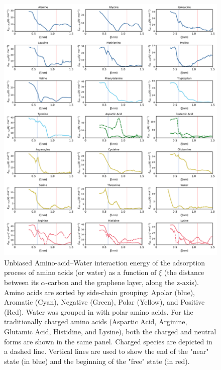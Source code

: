 \documentclass[9pt]{article}
\begin{document}
\begin{figure}[hbtp]
    \centering
    \includegraphics[width=\textwidth]{FigS5.pdf}
    \caption{Unbiased Amino-acid--Water interaction energy of the adsorption process of amino acids (or water) as a function of $\xi$ (the distance between its $\alpha$-carbon and the graphene layer, along the z-axis). Amino acids are sorted by side-chain grouping: Apolar (blue), Aromatic (Cyan), Negative (Green), Polar (Yellow), and Positive (Red). Water was grouped in with polar amino acids. For the traditionally charged amino acids (Aspartic Acid, Arginine, Glutamic Acid,  Histidine, and Lysine), both the charged and neutral forms are shown in the same panel. Charged species are depicted in a dashed line. Vertical lines are used to show the end of the "near" state (in blue) and the beginning of the "free" state (in red).}
    \label{fig:EnergyAA-W}
\end{figure}
\end{document}
